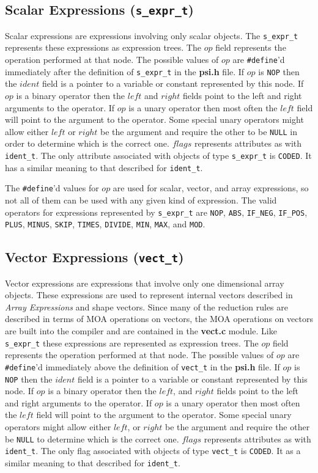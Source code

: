 \subsection{Scalar Expressions ({\tt s\_expr\_t})}
Scalar expressions are expressions involving only scalar objects.  The
{\tt s\_expr\_t} represents these expressions as expression trees.  The $op$
field represents the operation performed at that node.  The possible values
of $op$ are {\tt \#define}'d immediately after the definition of {\tt s\_expr\_t} in
the {\bf psi.h} file.  If $op$ is {\tt NOP} then the $ident$ field is a pointer to a 
variable or constant represented by this node.  If $op$ is a binary operator
then the $left$ and $right$ fields point to the left and right arguments
to the operator.  If $op$ is a unary operator then most often the $left$
field will point to the argument to the operator.  Some special unary operators
might allow either $left$ or $right$ be the argument and require the other to
be {\tt NULL} in order to determine which is the correct one.  $flags$ represents 
attributes as with {\tt ident\_t}.  The only attribute associated with objects of 
type {\tt s\_expr\_t}
is {\tt CODED}.  It has a similar meaning to that described for {\tt ident\_t}.

The {\tt \#define}'d values for $op$ are used for scalar, vector, and array 
expressions, so not all of them can be used with any given kind of expression.
The valid operators for expressions represented by {\tt s\_expr\_t} are
{\tt NOP}, {\tt ABS}, {\tt IF\_NEG}, {\tt IF\_POS}, {\tt PLUS}, {\tt MINUS},
{\tt SKIP}, {\tt TIMES}, {\tt DIVIDE}, {\tt MIN}, {\tt MAX}, and {\tt MOD}.

\subsection{Vector Expressions ({\tt vect\_t})}
Vector expressions are expressions that involve only one dimensional array
objects.  These expressions are used to represent internal vectors described in
{\it Array Expressions} and shape vectors.  Since many of the reduction rules
are described in terms of MOA operations on vectors, the MOA operations on 
vectors are built into the compiler and are contained in the {\bf vect.c} module.
Like {\tt s\_expr\_t} these expressions are represented as expression trees.  The 
$op$ field represents the operation performed at that node.  The possible 
values of $op$ are {\tt \#define}'d immediately above the definition of {\tt vect\_t} in
the {\bf psi.h} file.  If $op$ is {\tt NOP} then the $ident$ field is a pointer to a 
variable or constant represented by this node.  If $op$ is a binary operator
then the $left$, and $right$ fields point to the left and right arguments
to the operator.  If $op$ is a unary operator then most often the $left$
field will point to the argument to the operator.  Some special unary operators
might allow either $left$, or $right$ be the argument and require the other
be {\tt NULL} to determine which is the correct one.  $flags$ represents attributes
as with {\tt ident\_t}.  The only flag associated with objects of type {\tt vect\_t}
is {\tt CODED}.  It as a similar meaning to that described for {\tt ident\_t}.

